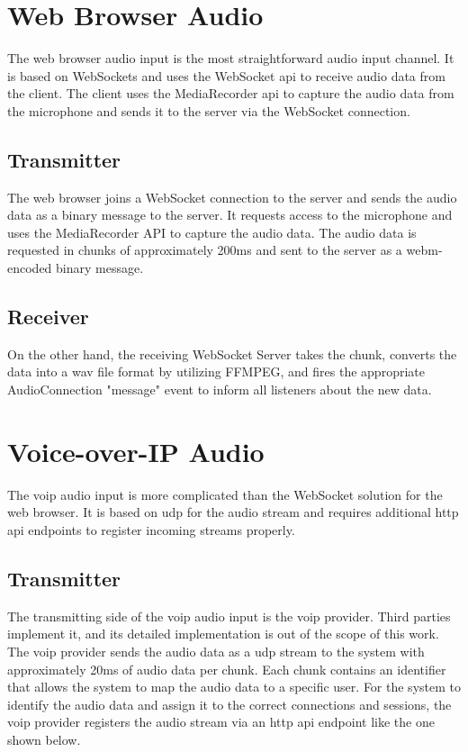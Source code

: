 \section{Web Browser Audio}

The web browser audio input is the most straightforward audio input channel. It is based on WebSockets and
uses the WebSocket \ac{api} to receive audio data from the client. The client uses the MediaRecorder \ac{api} to 
capture the audio data from the microphone and sends it to the server via the WebSocket connection.

\subsection{Transmitter}

The web browser joins a WebSocket connection to the server and sends the audio data as a binary message to the server. 
It requests access to the microphone and uses the MediaRecorder API to capture the audio data. 
The audio data is requested in chunks of approximately 200ms and sent to the server as a \ac{webm}-encoded binary message.

\subsection{Receiver}

On the other hand, the receiving WebSocket Server takes the chunk, converts the data into a \ac{wav} file format by 
utilizing FFMPEG, and fires the appropriate AudioConnection "message" event to inform all listeners about the new data.


\section{Voice-over-IP Audio}

The \ac{voip} audio input is more complicated than the WebSocket solution for the web browser. It is based on \ac{udp} 
for the audio stream and requires additional \ac{http} \ac{api} endpoints to register incoming streams properly.

\subsection{Transmitter}

The transmitting side of the \ac{voip} audio input is the \ac{voip} provider. Third parties implement it, and its 
detailed implementation is out of the scope of this work. The \ac{voip} provider sends the audio data as a \ac{udp} 
stream to the system with approximately 20ms of audio data per chunk. Each chunk contains an identifier that allows the 
system to map the audio data to a specific user. For the system to identify the audio data and assign it to the correct 
connections and sessions, the \ac{voip} provider registers the audio stream via an \ac{http} \ac{api} endpoint like the 
one shown below.

